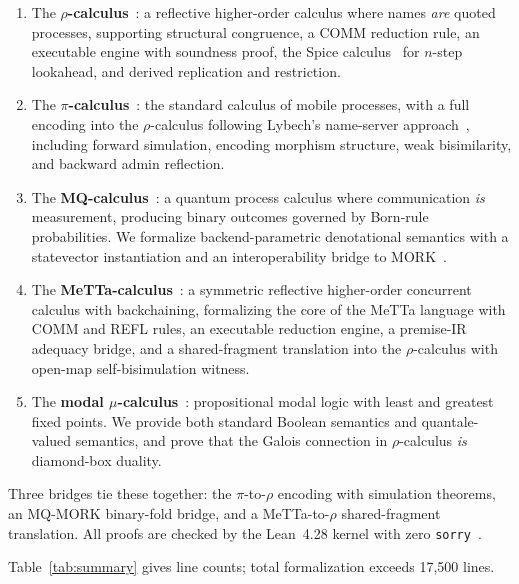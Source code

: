 \documentclass[11pt]{article}
\theoremstyle{definition}
\theoremstyle{remark}
\begin{document}
\begin{enumerate}[leftmargin=1.5em]
  \item The \textbf{$\rho$-calculus}~\cite{MeredithRadestock2005}: a
    reflective higher-order calculus where names \emph{are} quoted
    processes, supporting structural congruence, a COMM reduction rule,
    an executable engine with soundness proof, the Spice
    calculus~\cite{MeredithPresentMoment2026} for $n$-step lookahead, and
    derived replication and restriction.
  \item The \textbf{$\pi$-calculus}~\cite{Milner1999,SangiorgiWalker2001}:
    the standard calculus of mobile processes, with a full encoding into
    the $\rho$-calculus following Lybech's name-server
    approach~\cite{Lybech2022}, including forward simulation, encoding
    morphism structure, weak bisimilarity, and backward admin reflection.
  \item The \textbf{MQ-calculus}~\cite{StayMeredithMQ2026}: a quantum
    process calculus where communication \emph{is} measurement, producing
    binary outcomes governed by Born-rule probabilities.  We formalize
    backend-parametric denotational semantics with a statevector
    instantiation and an interoperability bridge to
    MORK~\cite{MeredithStayOSLF2020}.
  \item The \textbf{MeTTa-calculus}~\cite{MeredithMeTTaCalculus2024}: a
    symmetric reflective higher-order concurrent calculus with
    backchaining, formalizing the core of the MeTTa language with COMM
    and REFL rules, an executable reduction engine, a premise-IR
    adequacy bridge, and a shared-fragment translation into the
    $\rho$-calculus with open-map self-bisimulation witness.
  \item The \textbf{modal $\mu$-calculus}~\cite{Kozen1983,BradfieldStirling2007}:
    propositional modal logic with least and greatest fixed points.  We
    provide both standard Boolean semantics and quantale-valued
    semantics, and prove that the Galois connection in
    $\rho$-calculus \emph{is} diamond-box duality.
\end{enumerate}

Three bridges tie these together: the $\pi$-to-$\rho$ encoding with
simulation theorems, an MQ-MORK binary-fold bridge, and a
MeTTa-to-$\rho$ shared-fragment translation.
All proofs are checked by the Lean~4.28 kernel with zero
\texttt{sorry}~\cite{mathlib2020}.

Table~\ref{tab:summary} gives line counts; total formalization exceeds
17{,}500 lines.
\end{document}
